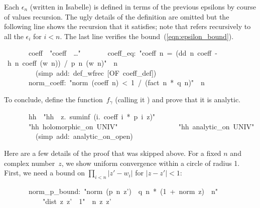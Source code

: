 \documentclass[runningheads]{llncs}
\begin{document}
Each $\epsilon_n$ (written   in Isabelle) is defined in terms of the previous epsilons by course of values recursion. 
The ugly details of the definition are omitted but the following line shows the recursion that it satisfies; note that \hbox{} refers recursively to all the $\epsilon_i$ for $i<n$. 
The last line verifies the bound~(\ref{eqn:epsilon_bound}).

\begin{isabelle}
\ \ \ \ \ \ \ coeff\ \ "coeff\ \isasymequiv\ \ldots"\isanewline
\ \ \ \ \ \ \ coeff\_eq:\ "coeff\ n\ =\ (dd\ n\ coeff\ -\ h\ n\ coeff\ (w\ n))\ /\ p\ n\ (w\ n)"\ \ n\isanewline
\ \ \ \ \ \ \ \ \ (simp\ add:\ def\_wfrec\ [OF\ coeff\_def])\isanewline
\ \ \ \ \ \ \ norm\_coeff:\ "norm\ (coeff\ n)\ <\ 1\ /\ (fact\ n\ *\ q\ n)"\ \ n\isanewline
\ \ \ \ \ \ \ \ \ \prf
\end{isabelle}

To conclude, define the function~$f_\gamma$ (calling it ) and prove that it is analytic. 

\begin{isabelle}
\ \ \ \ \ \ \ hh\ \ "hh\ \isasymequiv \ \isasymlambda z.\ suminf\ (\isasymlambda i.\ coeff\ i\ *\ p\ i\ z)"\isanewline
\ \ \ \ \ \ \ "hh\ holomorphic\_on\ UNIV"\isanewline
\ \ \ \ \ \ \ \ \prf\isanewline
\ \ \ \ \ \ \ \ "hh\ analytic\_on\ UNIV"\isanewline
\ \ \ \ \ \ \ \ \ (simp\ add:\ analytic\_on\_open)
\end{isabelle}

Here are a few details of the proof that was skipped above.
For a fixed $n$ and complex number~$z$, we show uniform convergence within a circle of radius 1.
First, we need a bound on $\prod_{i<n} |z' - w_i|$ for $|z-z'|< 1$:

\begin{isabelle}
\ \ \ \ \ \ \ norm\_p\_bound:\ "norm\ (p\ n\ z')\ \isasymle \ q\ n\ *\ (1\ +\ norm\ z)\ \isacharcircum \ n"\ \isanewline
\ \ \ \ \ \ \ \ \ \ \ "dist\ z\ z'\ \isasymle \ 1"\ \ n\ z\ z'\isanewline
\ \ \ \ \ \ \ \prf
\end{isabelle}
\end{document}
